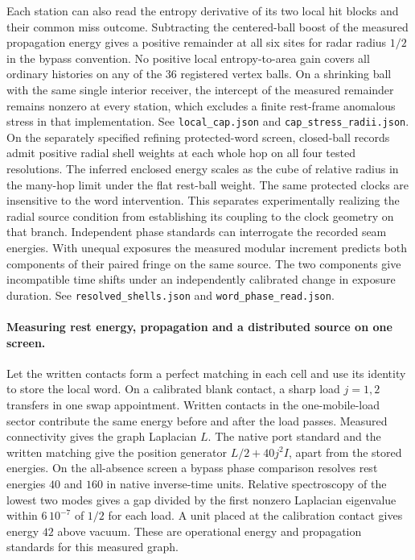 \documentclass[11pt]{article}
\begin{document}
Each station can also read the entropy derivative of its two local hit
blocks and their common miss outcome. Subtracting the centered-ball
boost of the measured propagation energy gives a positive remainder
at all six sites for radar radius \(1/2\) in the bypass convention.
No positive local entropy-to-area gain covers all ordinary histories
on any of the 36 registered vertex balls. On a shrinking ball with
the same single interior receiver, the intercept of the measured
remainder remains nonzero at every station, which excludes a finite
rest-frame anomalous stress in that implementation. See
\texttt{local\_cap.json} and \texttt{cap\_stress\_radii.json}.
On the separately specified refining protected-word screen, closed-ball
records admit positive radial shell weights at each whole hop on all four
tested resolutions. The inferred enclosed energy scales as the cube of
relative radius in the many-hop limit under the flat rest-ball weight.
The same protected clocks are insensitive to the word intervention.
This separates experimentally realizing the radial source condition
from establishing its coupling to the clock geometry on that branch.
Independent phase standards can interrogate the recorded seam energies.
With unequal exposures the measured modular increment predicts both
components of their paired fringe on the same source. The two
components give incompatible time shifts under an independently
calibrated change in exposure duration. See
\texttt{resolved\_shells.json} and \texttt{word\_phase\_read.json}.

\paragraph{Measuring rest energy, propagation and a distributed source on one screen.}
Let the written contacts form a perfect matching in each cell and use its
identity to store the local word. On a calibrated blank contact, a sharp
load \(j=1,2\) transfers in one swap appointment. Written contacts in
the one-mobile-load sector contribute the same energy before and after
the load passes. Measured connectivity gives the graph Laplacian \(L\).
The native port standard and the written matching give the position
generator \(L/2+40j^2 I\), apart from the stored energies. On the
all-absence screen a bypass phase comparison resolves rest energies
\(40\) and \(160\) in native inverse-time units. Relative spectroscopy
of the lowest two modes gives a gap divided by the first nonzero
Laplacian eigenvalue within \(6\,10^{-7}\) of \(1/2\) for each load.
A unit placed at the calibration contact gives energy \(42\) above
vacuum. These are operational energy and propagation standards for
this measured graph.
\end{document}
